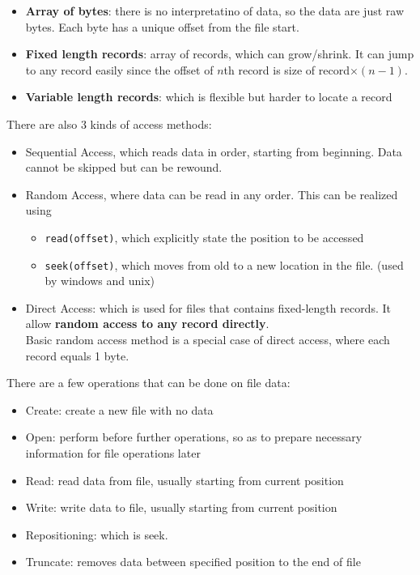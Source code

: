 \documentclass[12pt]{article}
\theoremstyle{definition}
\begin{document}
\begin{itemize}
  \item \textbf{Array of bytes}: there is no interpretatino of data, so the data are just raw bytes. Each byte has a unique offset from the file start.
  \item \textbf{Fixed length records}: array of records, which can grow/shrink. It can jump to any record easily since the offset of $n$th record is size of record$\times (n-1)$.
  \item \textbf{Variable length records}: which is flexible but harder to locate a record
\end{itemize}
There are also 3 kinds of access methods:
\begin{itemize}
  \item Sequential Access, which reads data in order, starting from beginning. Data cannot be skipped but can be rewound.
  \item Random Access, where data can be read in any order. This can be realized using
  \begin{itemize}
    \item \texttt{read(offset)}, which explicitly state the position to be accessed
    \item \texttt{seek(offset)}, which moves from old to a new location in the file. (used by windows and unix)
  \end{itemize}
  \item Direct Access: which is used for files that contains fixed-length records. It allow \textbf{random access to any record directly}. \\Basic random access method is a special case of direct access, where each record equals 1 byte.
\end{itemize}
There are a few operations that can be done on file data:
\begin{itemize}
  \item Create: create a new file with no data
  \item Open: perform before further operations, so as to prepare necessary information for file operations later
  \item Read: read data from file, usually starting from current position
  \item Write: write data to file, usually starting from current position
  \item Repositioning: which is seek.
  \item Truncate: removes data between specified position to the end of file
\end{itemize}
\end{document}
